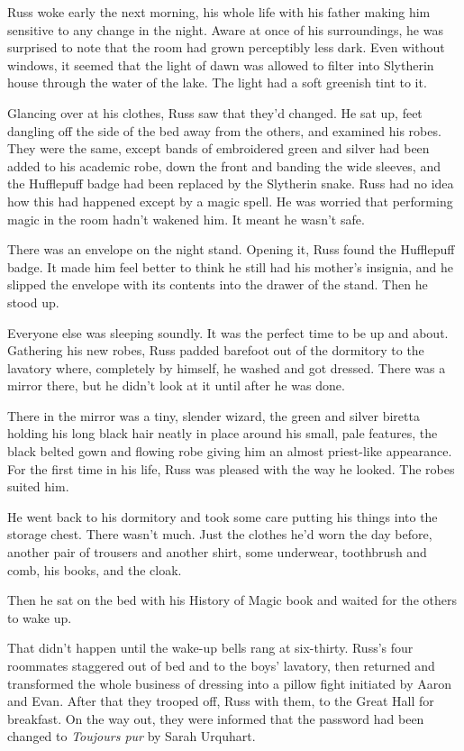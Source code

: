 \documentclass[a4paper,11pt]{article}
\begin{document}
Russ woke early the next morning, his whole life with his father making him sensitive to any change in the night. Aware at once of his surroundings, he was surprised to note that the room had grown perceptibly less dark. Even without windows, it seemed that the light of dawn was allowed to filter into Slytherin house through the water of the lake. The light had a soft greenish tint to it.

Glancing over at his clothes, Russ saw that they'd changed. He sat up, feet dangling off the side of the bed away from the others, and examined his robes. They were the same, except bands of embroidered green and silver had been added to his academic robe, down the front and banding the wide sleeves, and the Hufflepuff badge had been replaced by the Slytherin snake. Russ had no idea how this had happened except by a magic spell. He was worried that performing magic in the room hadn't wakened him. It meant he wasn't safe.

There was an envelope on the night stand. Opening it, Russ found the Hufflepuff badge. It made him feel better to think he still had his mother's insignia, and he slipped the envelope with its contents into the drawer of the stand. Then he stood up.

Everyone else was sleeping soundly. It was the perfect time to be up and about. Gathering his new robes, Russ padded barefoot out of the dormitory to the lavatory where, completely by himself, he washed and got dressed. There was a mirror there, but he didn't look at it until after he was done.

There in the mirror was a tiny, slender wizard, the green and silver biretta holding his long black hair neatly in place around his small, pale features, the black belted gown and flowing robe giving him an almost priest-like appearance. For the first time in his life, Russ was pleased with the way he looked. The robes suited him.

He went back to his dormitory and took some care putting his things into the storage chest. There wasn't much. Just the clothes he'd worn the day before, another pair of trousers and another shirt, some underwear, toothbrush and comb, his books, and the cloak.

Then he sat on the bed with his History of Magic book and waited for the others to wake up.

That didn't happen until the wake-up bells rang at six-thirty. Russ's four roommates staggered out of bed and to the boys' lavatory, then returned and transformed the whole business of dressing into a pillow fight initiated by Aaron and Evan. After that they trooped off, Russ with them, to the Great Hall for breakfast. On the way out, they were informed that the password had been changed to \emph{Toujours pur} by Sarah Urquhart.
\end{document}
